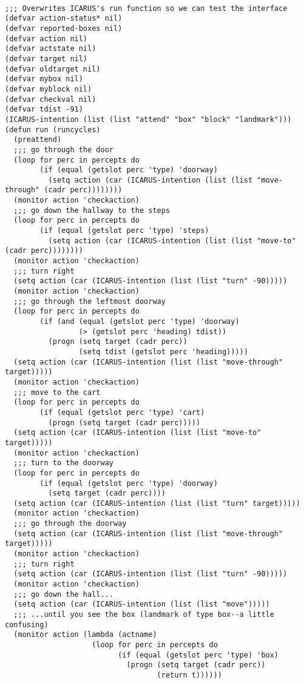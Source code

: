 \documentclass{article}
\begin{document}
\begin{verbatim}

;;; Overwrites ICARUS's run function so we can test the interface
(defvar action-status* nil)
(defvar reported-boxes nil)
(defvar action nil)
(defvar actstate nil)
(defvar target nil)
(defvar oldtarget nil)
(defvar mybox nil)
(defvar myblock nil)
(defvar checkval nil)
(defvar tdist -91)
(ICARUS-intention (list (list "attend" "box" "block" "landmark")))
(defun run (runcycles)
  (preattend)
  ;;; go through the door
  (loop for perc in percepts do
        (if (equal (getslot perc 'type) 'doorway)
          (setq action (car (ICARUS-intention (list (list "move-through" (cadr perc))))))))
  (monitor action 'checkaction)
  ;;; go down the hallway to the steps
  (loop for perc in percepts do
        (if (equal (getslot perc 'type) 'steps)
          (setq action (car (ICARUS-intention (list (list "move-to" (cadr perc))))))))
  (monitor action 'checkaction)
  ;;; turn right
  (setq action (car (ICARUS-intention (list (list "turn" -90)))))
  (monitor action 'checkaction)
  ;;; go through the leftmost doorway
  (loop for perc in percepts do
        (if (and (equal (getslot perc 'type) 'doorway)
                 (> (getslot perc 'heading) tdist))
          (progn (setq target (cadr perc))
                 (setq tdist (getslot perc 'heading)))))
  (setq action (car (ICARUS-intention (list (list "move-through" target)))))
  (monitor action 'checkaction)
  ;;; move to the cart
  (loop for perc in percepts do
        (if (equal (getslot perc 'type) 'cart)
          (progn (setq target (cadr perc)))))
  (setq action (car (ICARUS-intention (list (list "move-to" target)))))
  (monitor action 'checkaction)
  ;;; turn to the doorway
  (loop for perc in percepts do
        (if (equal (getslot perc 'type) 'doorway)
          (setq target (cadr perc))))
  (setq action (car (ICARUS-intention (list (list "turn" target)))))
  (monitor action 'checkaction)
  ;;; go through the doorway
  (setq action (car (ICARUS-intention (list (list "move-through" target)))))
  (monitor action 'checkaction)
  ;;; turn right
  (setq action (car (ICARUS-intention (list (list "turn" -90)))))
  (monitor action 'checkaction)
  ;;; go down the hall...
  (setq action (car (ICARUS-intention (list (list "move")))))
  ;;; ...until you see the box (landmark of type box--a little confusing)
  (monitor action (lambda (actname)
                    (loop for perc in percepts do
                          (if (equal (getslot perc 'type) 'box)
                            (progn (setq target (cadr perc))
                                   (return t))))))

\end{verbatim}
\end{document}
